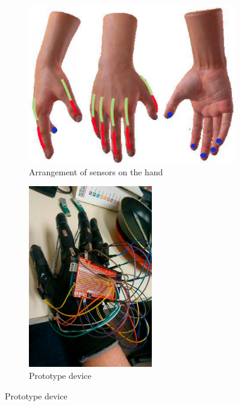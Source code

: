 \documentclass[hyperref, bachelorofscience]{cgvpub}
\begin{document}
\begin{figure}
	\begin{subfigure}{.57\linewidth}
		\includegraphics[width=\linewidth]{../pics/maitre_sensors}
		\caption{Arrangement of sensors on the hand}
		\label{fig:maitre_sensors}
	\end{subfigure}
	\hfill
	\begin{subfigure}{.3\linewidth}
		\includegraphics[width=\linewidth]{../pics/maitre_glove}
		\caption{Prototype device}
		\label{fig:maitre_glove}
	\end{subfigure}


\end{figure}
\end{document}
